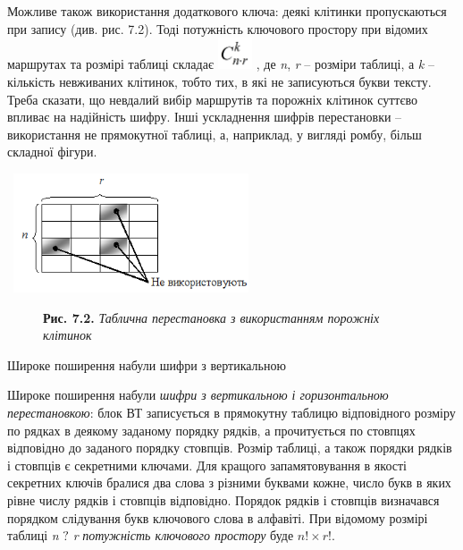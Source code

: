 \documentclass[a4paper]{article}
\newcounter{}
\begin{document}
\bigskip

Можливе також використання додаткового ключа: деякі клітинки пропускаються при
запису (див. рис. 7.2). Тоді потужність ключового простору при відомих
маршрутах та розмірі таблиці складає 
\includegraphics[width=0.4016in,height=0.3681in]{crypt-img/crypt-img67.png} ,
де \textit{n}, \textit{r }– розміри таблиці, а \textit{k}\textit{ }– кількість
невживаних клітинок, тобто тих, в які не записуються букви тексту. Треба
сказати, що невдалий  вибір маршрутів та порожніх клітинок суттєво впливає на
надійність шифру. Інші ускладнення шифрів перестановки – використання не
прямокутної таблиці, а, наприклад, у вигляді ромбу, більш складної фігури.


\bigskip


\bigskip

{\centering 
\includegraphics[width=2.8854in,height=1.3854in]{crypt-img/crypt-img68.png}
\par}



\begin{figure}
\centering
\begin{minipage}{6.1283in}
{\centering
\textbf{Рис. 7.2. }\textit{Таблична перестановка з використанням порожніх
}\textit{\textcolor[rgb]{0.0,0.5019608,0.0}{клітинок}}
\par}


\bigskip


\bigskip


\bigskip


\bigskip
\end{minipage}
\end{figure}
Широке поширення набули шифри з вертикальною 


\bigskip

\textbf{ }Широке \textcolor[rgb]{0.0,0.5019608,0.0}{поширення} набули
\textit{шифри з вертикальною і горизонтальною перестановкою}: блок ВТ
записується  в прямокутну таблицю відповідного розміру по рядках в деякому
заданому порядку рядків, а прочитується по стовпцях відповідно до заданого
порядку стовпців. Розмір таблиці, а також порядки рядків і стовпців є
секретними ключами. Для кращого запам{\textquotesingle}ятовування в якості
секретних ключів бралися  два слова з різними буквами кожне, число букв в яких
рівне числу рядків і стовпців відповідно. Порядок рядків і стовпців визначався
порядком слідування букв ключового слова в алфавіті.  При відомому розмірі
таблиці  \textit{n} ${?}$ \textit{r }\textit{ потужність ключового простору
}буде ${n!\times r!}$.
\end{document}
